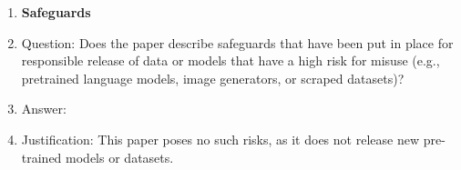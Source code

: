 \begin{enumerate}
\item {\bf Safeguards}
    \item[] Question: Does the paper describe safeguards that have been put in place for responsible release of data or models that have a high risk for misuse (e.g., pretrained language models, image generators, or scraped datasets)?
    \item[] Answer: \answerNA{} %
    \item[] Justification: This paper poses no such risks, as it does not release new pre-trained models or datasets.


\end{enumerate}
